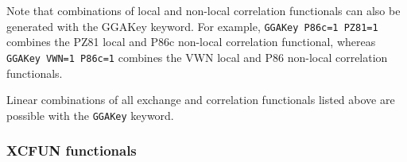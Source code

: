 \begin{description}
\begin{description}






\end{description}

Note that combinations of local and non-local correlation functionals
can also be generated with the GGAKey keyword. For example,
\verb|GGAKey P86c=1 PZ81=1| combines the PZ81 local and P86c non-local 
correlation functional, whereas \verb|GGAKey VWN=1 P86c=1| 
combines the VWN local and P86 non-local correlation functionals.


Linear combinations of all exchange and correlation functionals listed above
are possible with the \verb|GGAKey| keyword.


\subsubsection{XCFUN functionals}


\end{description}
